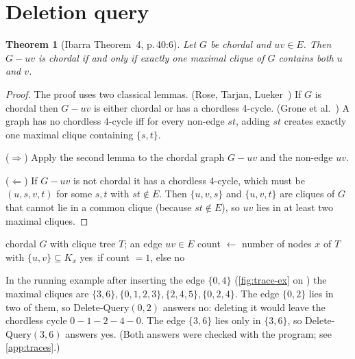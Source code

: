 \documentclass[11pt,a4paper,oneside]{report}
\theoremstyle{plain}
\newtheorem{theorem}{Theorem}[chapter]
\theoremstyle{definition}
\theoremstyle{remark}
\newcommand{\yes}{\textsf{yes}}
\newcommand{\no}{\textsf{no}}
\newcommand{\op}[1]{\textsf{#1}}
\begin{document}
\section{Deletion query}\label{sec:delete-query-math}
\begin{theorem}[Ibarra Theorem~4, p.\,40:6]\label{thm:delete}
Let \(G\) be chordal and \(uv\in E\). Then \(G-uv\) is chordal if and only if exactly one maximal
clique of \(G\) contains both \(u\) and \(v\).
\end{theorem}
\begin{proof}
The proof uses two classical lemmas. (Rose, Tarjan, Lueker~\cite{rose1976}) If \(G\) is chordal
then \(G-uv\) is either chordal or has a chordless 4-cycle. (Grone et al.~\cite{grone1984}) A
graph has no chordless 4-cycle iff for every non-edge \(st\), adding \(st\) creates exactly one
maximal clique containing \(\{s,t\}\).

(\(\Rightarrow\)) Apply the second lemma to the chordal graph \(G-uv\) and the non-edge \(uv\).

(\(\Leftarrow\)) If \(G-uv\) is not chordal it has a chordless 4-cycle, which must be
\((u,s,v,t)\) for some \(s,t\) with \(st\notin E\). Then \(\{u,v,s\}\) and \(\{u,v,t\}\) are cliques
of \(G\) that cannot lie in a common clique (because \(st\notin E\)), so \(uv\) lies in at least
two maximal cliques.
\end{proof}

\begin{algorithm}[ht]
\caption{\op{Delete-Query}\((u,v)\) (Ibarra \S3.1, p.\,40:7)}\label{alg:delete-query}
\begin{algorithmic}[1]
\Require chordal \(G\) with clique tree \(T\); an edge \(uv\in E\)
\State count \(\gets\) number of nodes \(x\) of \(T\) with \(\{u,v\}\subseteq K_x\)
\State \Return \yes\ if count \(=1\), else \no
\end{algorithmic}
\end{algorithm}

\begin{example}
In the running example after inserting the edge \(\{0,4\}\) (\cref{fig:trace-ex} on
) the maximal cliques are \(\{3,6\},\{0,1,2,3\},\{2,4,5\},\{0,2,4\}\). The
edge \(\{0,2\}\) lies in two of them, so \op{Delete-Query}\((0,2)\) answers \no: deleting it
would leave the chordless cycle \(0\!-\!1\!-\!2\!-\!4\!-\!0\). The edge \(\{3,6\}\) lies only in
\(\{3,6\}\), so \op{Delete-Query}\((3,6)\) answers \yes. (Both answers were checked with the
program; see \cref{app:traces}.)
\end{example}
\end{document}
